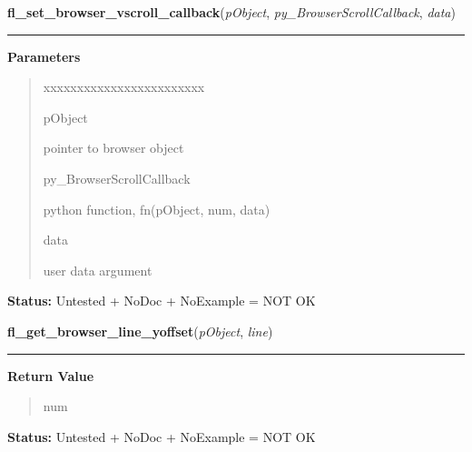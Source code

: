 \hspace{.8\funcindent}\begin{boxedminipage}{\funcwidth}

    \raggedright \textbf{fl\_set\_browser\_vscroll\_callback}(\textit{pObject}, \textit{py\_BrowserScrollCallback}, \textit{data})

    \vspace{-1.5ex}

    \rule{\textwidth}{0.5\fboxrule}
\setlength{\parskip}{2ex}
\setlength{\parskip}{1ex}
      \textbf{Parameters}
      \vspace{-1ex}

      \begin{quote}
        \begin{Ventry}{xxxxxxxxxxxxxxxxxxxxxxxx}

          \item[pObject]

          pointer to browser object

          \item[py\_BrowserScrollCallback]

          python function, fn(pObject, num, data)

          \item[data]

          user data argument

        \end{Ventry}

      \end{quote}

\textbf{Status:} Untested + NoDoc + NoExample = NOT OK



    \end{boxedminipage}

    \label{xformslib:library:fl_get_browser_line_yoffset}

    \vspace{0.5ex}

\hspace{.8\funcindent}\begin{boxedminipage}{\funcwidth}

    \raggedright \textbf{fl\_get\_browser\_line\_yoffset}(\textit{pObject}, \textit{line})

    \vspace{-1.5ex}

    \rule{\textwidth}{0.5\fboxrule}
\setlength{\parskip}{2ex}
\setlength{\parskip}{1ex}
      \textbf{Return Value}
    \vspace{-1ex}

      \begin{quote}
      num

      \end{quote}

\textbf{Status:} Untested + NoDoc + NoExample = NOT OK



    \end{boxedminipage}


